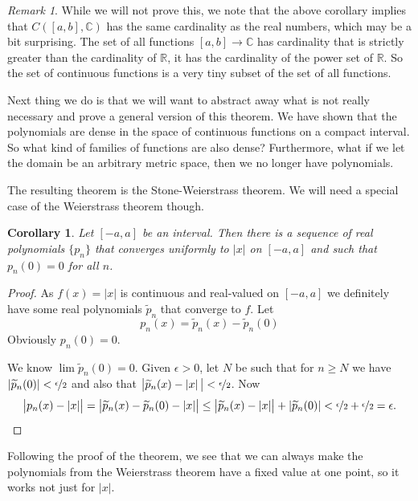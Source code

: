 \documentclass[12pt]{book}
\newcommand{\abs}[1]{\left\lvert {#1} \right\rvert}
\newcommand{\C}{{\mathbb{C}}}
\newcommand{\R}{{\mathbb{R}}}
\theoremstyle{plain}
\newtheorem{cor}[thm]{Corollary}
\theoremstyle{remark}
\newtheorem{remark}[thm]{Remark}
\theoremstyle{definition}
\theoremstyle{exercise}
\theoremstyle{example}
\begin{document}
\begin{remark}
While we will not prove this, we note that the above corollary implies that
$C([a,b],\C)$ has the same cardinality as the real numbers, which may be a
bit surprising.  The set of all functions $[a,b] \to \C$ has
cardinality that is strictly greater than the cardinality of $\R$, it has the
cardinality of the power set of $\R$.  So the
set of continuous functions is a very tiny subset of the set of all
functions.
\end{remark}

Next thing we do is that we will want to abstract away what is not really
necessary and prove a general version of this theorem.
We have shown that the polynomials are dense in the space of continuous
functions on a compact interval.  So what kind of families of
functions are also dense?  Furthermore, what if we let the domain be an
arbitrary metric space, then we no longer have polynomials.

The resulting theorem is the Stone-Weierstrass theorem.  We will need a
special case of the Weierstrass theorem though.

\begin{cor}
Let $[-a,a]$ be an interval.  Then there is a sequence of real polynomials
$\{ p_n \}$ that converges uniformly to $\abs{x}$ on $[-a,a]$ and such that
$p_n(0) = 0$ for all $n$.
\end{cor}

\begin{proof}
As $f(x) = \abs{x}$ is continuous and real-valued
on $[-a,a]$ we definitely have some
real polynomials $\widetilde{p}_n$ that converge to $f$.
Let
$$
p_n(x) = \widetilde{p}_n(x) - \widetilde{p}_n(0)
$$
Obviously $p_n(0) = 0$.

We know
$\lim \widetilde{p}_n(0) = 0$.  Given $\epsilon > 0$, let $N$ be such that
for $n \geq N$ we have $\abs{\widetilde{p}_n(0)} < \nicefrac{\epsilon}{2}$
and also that $\bigl\lvert\widetilde{p}_n(x)-\abs{x}\big\rvert < \nicefrac{\epsilon}{2}$.
Now
$$
\bigl\lvert p_n(x)-\abs{x} \bigr\rvert
=
\bigl\lvert \widetilde{p}_n(x) - \widetilde{p}_n(0) - \abs{x} \bigr\rvert
\leq
\bigl\lvert \widetilde{p}_n(x) - \abs{x} \bigr\rvert + \abs{\widetilde{p}_n(0)} < 
\nicefrac{\epsilon}{2} + \nicefrac{\epsilon}{2} = \epsilon .
$$
\end{proof}

Following the proof of the theorem,
we see that we can always make the polynomials from the Weierstrass theorem
have a fixed value at one point, so it works not just for $\abs{x}$.
\end{document}
